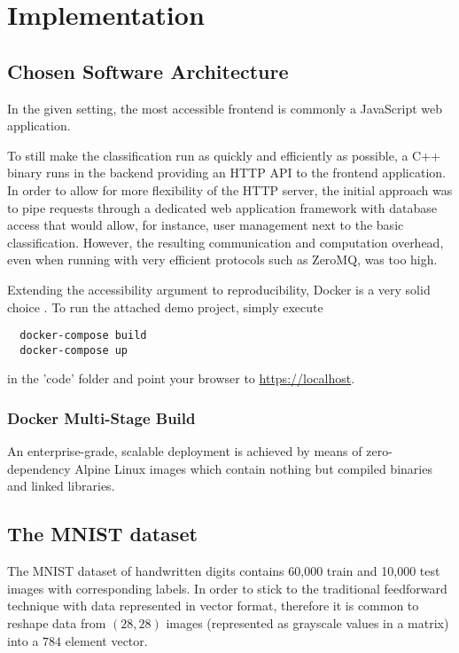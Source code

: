 \chapter{Implementation}
\label{chap:implementation}

\section{Chosen Software Architecture}
In the given setting, the most accessible frontend is commonly a JavaScript web application.

To still make the classification run as quickly and efficiently as possible, a C++ binary runs in the backend providing an HTTP API to the frontend application.
In order to allow for more flexibility of the HTTP server, the initial approach was to pipe requests through a dedicated web application framework with database access that would allow, for instance, user management next to the basic classification.
However, the resulting communication and computation overhead, even when running with very efficient protocols such as ZeroMQ, was too high.

Extending the accessibility argument to reproducibility, Docker is a very solid choice \parencite{using-docker-in-science}.
To run the attached demo project, simply execute
\begin{verbatim}
  docker-compose build
  docker-compose up
\end{verbatim}
in the 'code' folder and point your browser to \url{https://localhost}.


\subsection{Docker Multi-Stage Build}
An enterprise-grade, scalable deployment is achieved by means of zero-dependency
Alpine Linux images which contain nothing but compiled binaries and linked libraries.

\section{The MNIST dataset}
The MNIST dataset of handwritten digits \parencite{mnist-original} contains 60,000 train and 10,000 test images with corresponding labels.
In order to stick to the traditional feedforward technique with data represented in vector format, therefore it is common to reshape data from $(28, 28)$ images (represented as grayscale values in a matrix)
into a $784$ element vector.

